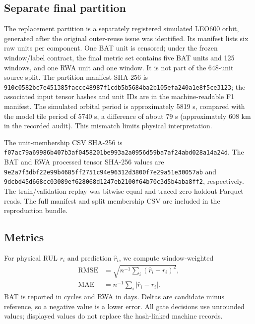 \documentclass[journal]{IEEEtran}
\begin{document}
\subsection{Separate final partition}
The replacement partition is a separately registered simulated LEO600 orbit, generated after the original outer-reuse issue was identified. Its manifest lists six raw units per component. One BAT unit is censored; under the frozen window/label contract, the final metric set contains five BAT units and 125 windows, and one RWA unit and one window. It is not part of the 648-unit source split. The partition manifest SHA-256 is \texttt{910c0582\allowbreak bc7e4513\allowbreak 85faccc4\allowbreak 8987f1cd\allowbreak b5b5684b\allowbreak a2b105ef\allowbreak a240a1e8\allowbreak f5ce3123}; the associated input tensor hashes and unit IDs are in the machine-readable F1 manifest. The simulated orbital period is approximately 5819 s, compared with the model tile period of 5740 s, a difference of about 79 s (approximately 608 km in the recorded audit). This mismatch limits physical interpretation.

The unit-membership CSV SHA-256 is \texttt{f07ac79a\allowbreak 69986b40\allowbreak 7b3af045\allowbreak 8201be99\allowbreak 3a2a0956\allowbreak d59ba7af\allowbreak 24abd028\allowbreak a14a24d}. The BAT and RWA processed tensor SHA-256 values are \texttt{9e2a7f3d\allowbreak bf22e99b\allowbreak 4685ff27\allowbreak 51c94e96\allowbreak 312d3800\allowbreak f7e29a51\allowbreak e30057ab} and \texttt{9dcbd45d\allowbreak 668cc030\allowbreak 89ef6280\allowbreak 68d1247e\allowbreak b2100f64\allowbreak b70c3d5b\allowbreak 4aba8ff2}, respectively. The train/validation replay was bitwise equal and traced zero holdout Parquet reads. The full manifest and split membership CSV are included in the reproduction bundle.

\subsection{Metrics}
For physical RUL $r_i$ and prediction $\hat r_i$, we compute window-weighted
\begin{equation}
 \begin{aligned}
 \mathrm{RMSE}&=\sqrt{n^{-1}\sum_i(\hat r_i-r_i)^2},\\[-1pt]
 \mathrm{MAE}&=n^{-1}\sum_i|\hat r_i-r_i|.
 \end{aligned}
\end{equation}
BAT is reported in cycles and RWA in days. Deltas are candidate minus reference, so a negative value is a lower error. All gate decisions use unrounded values; displayed values do not replace the hash-linked machine records.
\end{document}
